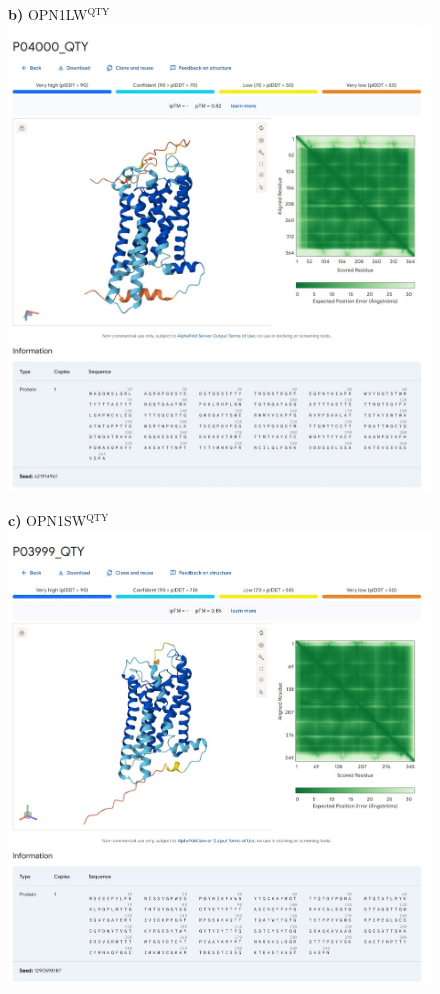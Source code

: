 \documentclass[fleqn,12pt]{supp}
\begin{document}
\newpage
\begin{figure}[H]
    \textbf{b)} OPN1LW$^{\textrm{QTY}}$ \\
    \includegraphics[width=\linewidth]{SuppFigures/af3 opn1lw qty.jpg}
\end{figure}

\newpage
\begin{figure}[H]
    \textbf{c)} OPN1SW$^{\textrm{QTY}}$ \\
    \includegraphics[width=\linewidth]{SuppFigures/af3 opn1sw qty.jpg}
\end{figure}
\end{document}
